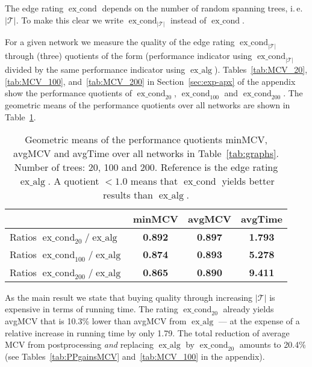 \documentclass[pdftex]{llncs}
\newcommand{\ie}{i.\,e.\xspace}
\newcommand{\excond}{\operatorname{ex\_cond}}
\newcommand{\exalg}{\operatorname{ex\_alg}}
\numberwithin{equation}{section}
\numberwithin{example}{section}
\numberwithin{table}{section}
\begin{document}
The edge rating $\excond$ depends on the number of random spanning
trees, \ie $\vert \mathcal{T} \vert$. To make this clear we write
$\excond_{\vert \mathcal{T} \vert}$ instead of $\excond$.

For a given network we measure the quality of the edge rating
$\excond_{\vert \mathcal{T} \vert}$ through (three) quotients of the
form (performance indicator using $\excond_{\vert \mathcal{T} \vert}$
divided by the same performance indicator using
$\exalg$). Tables~\ref{tab:MCV_20}, \ref{tab:MCV_100},
and~\ref{tab:MCV_200} in Section~\ref{sec:exp-apx} of the appendix
show the performance quotients of $\excond_{20}$, $\excond_{100}$ and
$\excond_{200}$. The geometric means of the performance quotients over
all networks are shown in Table~\ref{tab:meansQuot}.

\begin{table}[tb]
  \caption{Geometric means of the performance quotients minMCV, avgMCV
    and avgTime over all networks in
    Table~\ref{tab:graphs}. Number of trees: 20, 100 and 200. Reference is the edge
    rating $\exalg$. A quotient $< 1.0$ means that
    $\excond$ yields better results than $\exalg$.}
\begin{center}
\begin{tabular}{ l | c c | c }
                               & minMCV            & avgMCV              & avgTime\\\hline \hline                                 
Ratios $\excond_{20}  / \exalg$ & \textbf{0.892}    & \textbf{0.897}      & \textbf{1.793}\\ \hline
Ratios $\excond_{100} / \exalg$ & \textbf{0.874}    & \textbf{0.893}      & \textbf{5.278}\\ \hline
Ratios $\excond_{200} / \exalg$ & \textbf{0.865}    & \textbf{0.890}      & \textbf{9.411}\\ \hline
\end{tabular}
\end{center}
\label{tab:meansQuot}
\vspace{-7mm} 
\end{table}

As the main result we state that buying quality through increasing
${\vert \mathcal{T} \vert}$ is expensive in terms of running time. The
rating $\excond_{20}$ already yields avgMCV that is 10.3\% lower than
avgMCV from $\exalg$ --- at the expense of a relative increase in
running time by only 1.79. The total reduction of average MCV from
postprocessing {\em and} replacing $\exalg$ by $\excond_{20}$ amounts
to 20.4\% (see Tables~\ref{tab:PPgainsMCV} and~\ref{tab:MCV_100} in
the appendix).
\end{document}
